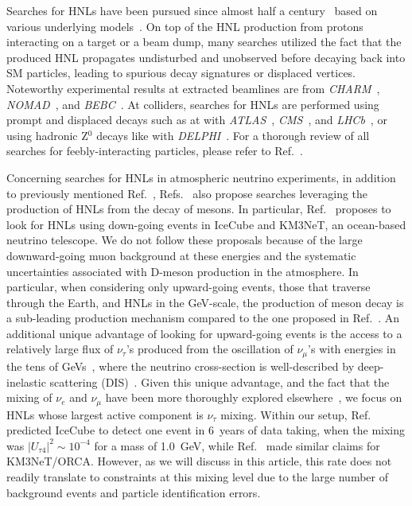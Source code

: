 \documentclass[
    aps,
    prd,
    reprint,
    amsmath,
    amssymb,
    nofootinbib,
    superscriptaddress,
    floatfix
]{revtex4-2}
\newcommand{\gev}{\giga\electronvolt}
\def\nomathut4{|U_{\tau4}|^2}
\begin{document}
Searches for HNLs have been pursued since almost half a century~\cite{Abdullahi:2022jlv} based on various underlying models~\cite{Fernandez-Martinez:2023phj}. On top of the HNL production from protons interacting on a target or a beam dump, many searches utilized the fact that the produced HNL propagates undisturbed and unobserved before decaying back into SM particles, leading to spurious decay signatures or displaced vertices. Noteworthy experimental results at extracted beamlines are from \textit{CHARM}~\cite{CHARM:1983ayi, Orloff:2002de, Boiarska:2021yho}, \textit{NOMAD}~\cite{NOMAD:2001eyx}, and \textit{BEBC}~\cite{Barouki:2022bkt, BEBC_OG_COOPERSARKAR1985207}. At colliders, searches for HNLs are performed using prompt and displaced decays such as at with \textit{ATLAS}~\cite{ATLAS:2019kpx, atlas_2022_HNL_PhysRevLett.131.061803}, \textit{CMS}~\cite{CMS:2018iaf, CMS:2022fut}, and \textit{LHCb}~\cite{LHCb:2020wxx}, or using hadronic Z$^0$ decays like with \textit{DELPHI}~\cite{DELPHI:1996qcc}. For a thorough review of all searches for feebly-interacting particles, please refer to Ref.~\cite{Agrawal:2021dbo}.

Concerning searches for HNLs in atmospheric neutrino experiments, in addition to previously mentioned Ref.~\cite{Coloma:2017ppo}, Refs.~\cite{Boiarska:2021yho,Coloma:2019htx,Arguelles:2019ziu} also propose searches leveraging the production of HNLs from the decay of mesons. In particular, Ref.~\cite{Boiarska:2021yho} proposes to look for HNLs using down-going events in IceCube and KM3NeT, an ocean-based neutrino telescope.
We do not follow these proposals because of the large downward-going muon background at these energies and the systematic uncertainties associated with D-meson production in the atmosphere.
In particular, when considering only upward-going events, those that traverse through the Earth, and HNLs in the GeV-scale, the production of meson decay is a sub-leading production mechanism compared to the one proposed in Ref.~\cite{Coloma:2017ppo}.
An additional unique advantage of looking for upward-going events is the access to a relatively large flux of $\nu_\tau$'s produced from the oscillation of $\nu_\mu$'s with energies in the tens of GeVs~\cite{IceCubeCollaboration:2023wtb}, where the neutrino cross-section is well-described by deep-inelastic scattering (DIS)~\cite{Formaggio:2012cpf}.
Given this unique advantage, and the fact that the mixing of $\nu_e$ and $\nu_\mu$ have been more thoroughly explored elsewhere~\cite{ParticleDataGroup:2024cfk}, we focus on HNLs whose largest active component is $\nu_\tau$ mixing.
Within our setup, Ref.~\cite{Coloma:2017ppo} predicted IceCube to detect one event in \SI{6}{years} of data taking, when the mixing was $\nomathut4\sim10^{-4}$ for a mass of \SI{1.0}{\gev}, while Ref.~\cite{Boiarska:2021yho} made similar claims for KM3NeT/ORCA.
However, as we will discuss in this article, this rate does not readily translate to constraints at this mixing level due to the large number of background events and particle identification errors. 
\end{document}
